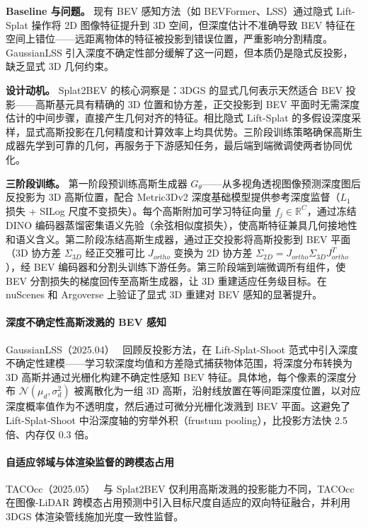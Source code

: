 \textbf{Baseline 与问题。} 现有 BEV 感知方法（如 BEVFormer、LSS）通过隐式 Lift-Splat 操作将 2D 图像特征提升到 3D 空间，但深度估计不准确导致 BEV 特征在空间上错位——远距离物体的特征被投影到错误位置，严重影响分割精度。GaussianLSS 引入深度不确定性部分缓解了这一问题，但本质仍是隐式反投影，缺乏显式 3D 几何约束。

\textbf{设计动机。} Splat2BEV 的核心洞察是：3DGS 的显式几何表示天然适合 BEV 投影——高斯基元具有精确的 3D 位置和协方差，正交投影到 BEV 平面时无需深度估计的中间步骤，直接产生几何对齐的特征。相比隐式 Lift-Splat 的多假设深度采样，显式高斯投影在几何精度和计算效率上均具优势。三阶段训练策略确保高斯生成器先学到可靠的几何，再服务于下游感知任务，最后端到端微调使两者协同优化。

\textbf{三阶段训练。} 第一阶段预训练高斯生成器 $G_\theta$——从多视角透视图像预测深度图后反投影为 3D 高斯位置，配合 Metric3Dv2 深度基础模型提供参考深度监督（$L_1$ 损失 + SILog 尺度不变损失）。每个高斯附加可学习特征向量 $f_j \in \mathbb{R}^C$，通过冻结 DINO 编码器蒸馏密集语义先验（余弦相似度损失），使高斯特征兼具几何接地性和语义含义。第二阶段冻结高斯生成器，通过正交投影将高斯投影到 BEV 平面（3D 协方差 $\Sigma_{3D}$ 经正交雅可比 $J_{ortho}$ 变换为 2D 协方差 $\Sigma_{2D} = J_{ortho} \Sigma_{3D} J_{ortho}^T$），经 BEV 编码器和分割头训练下游任务。第三阶段端到端微调所有组件，使 BEV 分割损失的梯度回传至高斯生成器，让 3D 重建适应任务级目标。在 nuScenes 和 Argoverse 上验证了显式 3D 重建对 BEV 感知的显著提升。

\paragraph{深度不确定性高斯泼溅的 BEV 感知}

GaussianLSS（2025.04）~\cite{2504_01957} 回顾反投影方法，在 Lift-Splat-Shoot 范式中引入深度不确定性建模——学习软深度均值和方差隐式捕获物体范围，将深度分布转换为 3D 高斯并通过光栅化构建不确定性感知 BEV 特征。具体地，每个像素的深度分布 $\mathcal{N}(\mu_d, \sigma_d^2)$ 被离散化为一组 3D 高斯，沿射线放置在等间距深度位置，以对应深度概率值作为不透明度，然后通过可微分光栅化泼溅到 BEV 平面。这避免了 Lift-Splat-Shoot 中沿深度轴的穷举外积（frustum pooling），比投影方法快 2.5 倍、内存仅 0.3 倍。

\paragraph{自适应邻域与体渲染监督的跨模态占用}

TACOcc（2025.05）~\cite{2505_12693} 与 Splat2BEV 仅利用高斯泼溅的投影能力不同，TACOcc 在图像-LiDAR 跨模态占用预测中引入目标尺度自适应的双向特征融合，并利用 3DGS 体渲染管线施加光度一致性监督。

